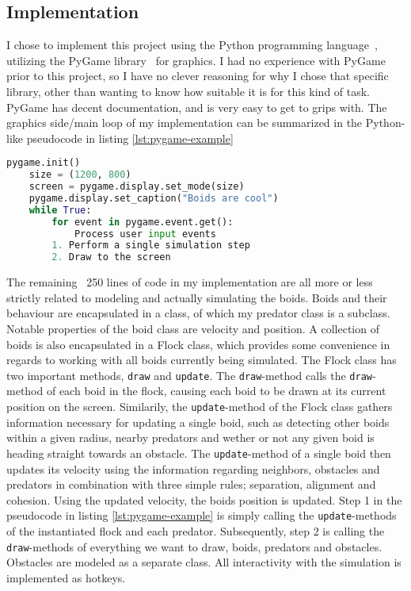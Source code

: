 \documentclass[twoside]{article}
\begin{document}
\begin{multicols}{2} %

    \section{Implementation}

    I chose to implement this project using the Python programming language~\cite{python}, utilizing the PyGame library~\cite{pygame} for graphics. 
    I had no experience with PyGame prior to this project, so I have no clever reasoning for why I chose that specific library, other than wanting to know how suitable it is for this kind of task.
    PyGame has decent documentation, and is very easy to get to grips with. 
    The graphics side/main loop of my implementation can be summarized in the Python-like pseudocode in listing \ref{lst:pygame-example}

    \begin{lstlisting}[language=Python, caption=Minimal viable PyGame example, label={lst:pygame-example}]
    pygame.init()
    size = (1200, 800)
    screen = pygame.display.set_mode(size)
    pygame.display.set_caption("Boids are cool")
    while True:
        for event in pygame.event.get():
            Process user input events
        1. Perform a single simulation step
        2. Draw to the screen
    \end{lstlisting}

    The remaining ~250 lines of code in my implementation are all more or less strictly related to modeling and actually simulating the boids.
    Boids and their behaviour are encapsulated in a class, of which my predator class is a subclass.
    Notable properties of the boid class are velocity and position.
    A collection of boids is also encapsulated in a Flock class, which provides some convenience in regards to working with all boids currently being simulated.
    The Flock class has two important methods, \texttt{draw} and \texttt{update}.
    The \texttt{draw}-method calls the \texttt{draw}-method of each boid in the flock, causing each boid to be drawn at its current position on the screen.
    Similarily, the \texttt{update}-method of the Flock class gathers information necessary for updating a single boid, such as detecting other boids within a given radius, nearby predators and wether or not any given boid is heading straight towards an obstacle.
    The \texttt{update}-method of a single boid then updates its velocity using the information regarding neighbors, obstacles and predators in combination with three simple rules; separation, alignment and cohesion.
    Using the updated velocity, the boids position is updated.
    Step 1 in the pseudocode in listing \ref{lst:pygame-example} is simply calling the \texttt{update}-methods of the instantiated flock and each predator.
    Subsequently, step 2 is calling the \texttt{draw}-methods of everything we want to draw, boids, predators and obstacles.
    Obstacles are modeled as a separate class.
    All interactivity with the simulation is implemented as hotkeys.


\end{multicols}
\end{document}
